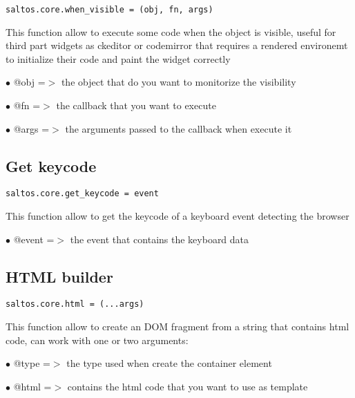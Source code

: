 \documentclass[a4paper]{book}
\begin{document}
\begin{lstlisting}
saltos.core.when_visible = (obj, fn, args)
\end{lstlisting}

This function allow to execute some code when the object is visible, useful for third part
widgets as ckeditor or codemirror that requires a rendered environemt to initialize their
code and paint the widget correctly

\begin{compactitem}
\item[\color{myblue}$\bullet$] @obj  =$>$ the object that do you want to monitorize the visibility
\item[\color{myblue}$\bullet$] @fn   =$>$ the callback that you want to execute
\item[\color{myblue}$\bullet$] @args =$>$ the arguments passed to the callback when execute it
\end{compactitem}

\hypertarget{toc515}{}
\subsection{Get keycode}

\begin{lstlisting}
saltos.core.get_keycode = event
\end{lstlisting}

This function allow to get the keycode of a keyboard event detecting the browser

\begin{compactitem}
\item[\color{myblue}$\bullet$] @event =$>$ the event that contains the keyboard data
\end{compactitem}

\hypertarget{toc516}{}
\subsection{HTML builder}

\begin{lstlisting}
saltos.core.html = (...args)
\end{lstlisting}

This function allow to create an DOM fragment from a string that contains html code, can
work with one or two arguments:

\begin{compactitem}
\item[\color{myblue}$\bullet$] @type =$>$ the type used when create the container element
\item[\color{myblue}$\bullet$] @html =$>$ contains the html code that you want to use as template
\end{compactitem}
\end{document}
